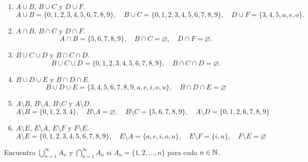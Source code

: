 \documentclass[12pt,a4paper]{article}
\begin{document}
    \begin{solucion}
        \begin{enumerate}
            \item[(a)] $A\cup B$, $B\cup C$ y $D\cup F$.
            \begin{equation*}
                A\cup B=\{0,1,2,3,4,5,6,7,8,9\},\quad B\cup C=\{0,1,2,3,4,5,6,7,8,9\},\quad D\cup F=\{3,4,5,a,e,o\}.
            \end{equation*}
            \item[(b)] $A\cap B$, $B\cap C$ y $D\cap F$.
            \begin{equation*}
                A\cap B=\{5,6,7,8,9\},\quad B\cap C=\varnothing,\quad D\cap F=\varnothing.
            \end{equation*}
            \item[(c)] $B\cup C\cup D$ y $B\cap C\cap D$.
            \begin{equation*}
                B\cup C\cup D=\{0,1,2,3,4,5,6,7,8,9\},\quad B\cap C\cap D=\varnothing.
            \end{equation*}
            \item[(d)] $B\cup D\cup E$ y $B\cap D\cap E$.
            \begin{equation*}
                B\cup D\cup E=\{3,4,5,6,7,8,9,a,e,i,o,u\},\quad B\cap D\cap E=\varnothing
            \end{equation*}
            \item[(e)] $A\setminus B$, $B\setminus A$, $B\setminus C$ y $A\setminus D$.
            \begin{equation*}
                A\setminus B=\{0,1,2,3,4\},\quad B\setminus A=\varnothing,\quad B\setminus C=\{5,6,7,8,9\},\quad A\setminus D=\{0,1,2,6,7,8,9\}
            \end{equation*}
            \item[(f)] $A\setminus E$, $E\setminus A$, $E\setminus F$ y $F\setminus E$.
            \begin{equation*}
                A\setminus E=\{0,1,2,3,4,5,6,7,8,9\},\quad E\setminus A=\{a,e,i,o,u\},\quad E\setminus F=\{i,u\},\quad F\setminus E=\varnothing
            \end{equation*}
        \end{enumerate}
    \end{solucion}

    \begin{problema}
        Encuentra $\bigcup_{n=1}^{\infty}A_{n}$ y $\bigcap_{n=1}^{\infty}A_{n}$ si $A_{n}=\{1,2,\dots,n\}$
        para cada $n\in\mathbb{N}$.
    \end{problema}
\end{document}
